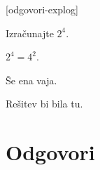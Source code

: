 
\def\datotekaOdgovori{odgovori-explog}

[\datotekaOdgovori]

%

\begin{vaja}
  Izračunajte $2^4$.

  \begin{odgovor}
    $2^4 = 4^2$.
  \end{odgovor}
\end{vaja}

\begin{vaja}
  Še ena vaja.

  \begin{odgovor}
    Rešitev bi bila tu.
  \end{odgovor}
\end{vaja}




\section{Odgovori}
\label{sec:explog-odgovori}




